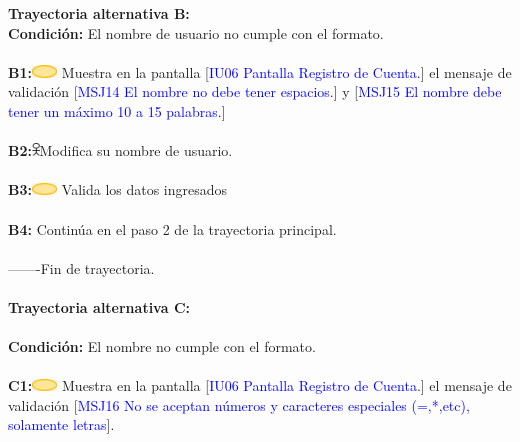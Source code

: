                     \textbf{Trayectoria alternativa B:}\\
                        \textbf{Condición:} El nombre de usuario no cumple con el formato.\\\\
                        \textbf{B1:}\includegraphics[width=0.0500\textwidth]{Figuras/sistema.png} Muestra en la pantalla [\textcolor{blue}{IU06 Pantalla Registro de Cuenta}.] el mensaje de validación [\textcolor{blue}{MSJ14 El nombre no debe tener espacios}.] y  [\textcolor{blue}{MSJ15 El nombre debe tener un máximo 10 a 15 palabras}.]\\\\ 
                        \textbf{B2:}\includegraphics[width=0.0150\textwidth]{Figuras/persona.png}Modifica su nombre de usuario.\\\\
                        \textbf{B3:}\includegraphics[width=0.0500\textwidth]{Figuras/sistema.png} Valida los datos ingresados\\\\
                        \textbf{B4:} Continúa en el paso 2 de la trayectoria principal. \\\\
        -------Fin de  trayectoria. \\\\

    
                     \textbf{Trayectoria alternativa C:}\\\\
                        \textbf{Condición: } El nombre no cumple con el formato.\\\\
                        \textbf{C1:}\includegraphics[width=0.0500\textwidth]{Figuras/sistema.png} Muestra en la pantalla [\textcolor{blue}{IU06 Pantalla Registro de Cuenta}.] el mensaje de validación [\textcolor{blue}{MSJ16 No se aceptan números y caracteres especiales (=,*,etc), solamente letras}].  \\\\
                        
